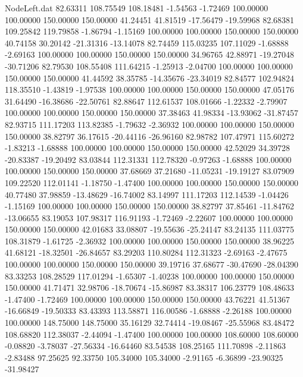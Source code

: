 \begin{filecontents}{NodeLeft.dat}
  82.63311  108.75549  108.18481    -1.54563   -1.72469  100.00000  100.00000  150.00000  150.00000   41.24451   41.81519  -17.56479  -19.59968
  82.68381  109.25842  119.79858    -1.86794   -1.15169  100.00000  100.00000  150.00000  150.00000   40.74158   30.20142  -21.31316  -13.14078
  82.74459  115.03235  107.11029    -1.68888   -2.69163  100.00000  100.00000  150.00000  150.00000   34.96765   42.88971  -19.27048  -30.71206
  82.79530  108.55408  111.64215    -1.25913   -2.04700  100.00000  100.00000  150.00000  150.00000   41.44592   38.35785  -14.35676  -23.34019
  82.84577  102.94824  118.35510    -1.43819   -1.97538  100.00000  100.00000  150.00000  150.00000   47.05176   31.64490  -16.38686  -22.50761
  82.88647  112.61537  108.01666    -1.22332   -2.79907  100.00000  100.00000  150.00000  150.00000   37.38463   41.98334  -13.93062  -31.87457
  82.93715  111.17203  113.82385    -1.79632   -2.36932  100.00000  100.00000  150.00000  150.00000   38.82797   36.17615  -20.44116  -26.96160
  82.98782  107.47971  115.60272    -1.83213   -1.68888  100.00000  100.00000  150.00000  150.00000   42.52029   34.39728  -20.83387  -19.20492
  83.03844  112.31331  112.78320    -0.97263   -1.68888  100.00000  100.00000  150.00000  150.00000   37.68669   37.21680  -11.05231  -19.19127
  83.07909  109.22520  112.01141    -1.18750   -1.47400  100.00000  100.00000  150.00000  150.00000   40.77480   37.98859  -13.48629  -16.74002
  83.14997  111.17203  112.14539    -1.04426   -1.15169  100.00000  100.00000  150.00000  150.00000   38.82797   37.85461  -11.84762  -13.06655
  83.19053  107.98317  116.91193    -1.72469   -2.22607  100.00000  100.00000  150.00000  150.00000   42.01683   33.08807  -19.55636  -25.24147
  83.24135  111.03775  108.31879    -1.61725   -2.36932  100.00000  100.00000  150.00000  150.00000   38.96225   41.68121  -18.32501  -26.84657
  83.29203  110.80284  112.31323    -2.69163   -2.47675  100.00000  100.00000  150.00000  150.00000   39.19716   37.68677  -30.47690  -28.04390
  83.33253  108.28529  117.01294    -1.65307   -1.40238  100.00000  100.00000  150.00000  150.00000   41.71471   32.98706  -18.70674  -15.86987
  83.38317  106.23779  108.48633    -1.47400   -1.72469  100.00000  100.00000  150.00000  150.00000   43.76221   41.51367  -16.66849  -19.50333
  83.43393  113.58871  116.00586    -1.68888   -2.26188  100.00000  100.00000  148.75000  148.75000   35.16129   32.74414  -19.08467  -25.55968
  83.48472  108.68820  112.38037    -2.44094   -1.47400  100.00000  100.00000  108.60000  108.60000   -0.08820   -3.78037  -27.56334  -16.64460
  83.54538  108.25165  111.70898    -2.11863   -2.83488   97.25625   92.33750  105.34000  105.34000   -2.91165   -6.36899  -23.90325  -31.98427

\end{filecontents}
